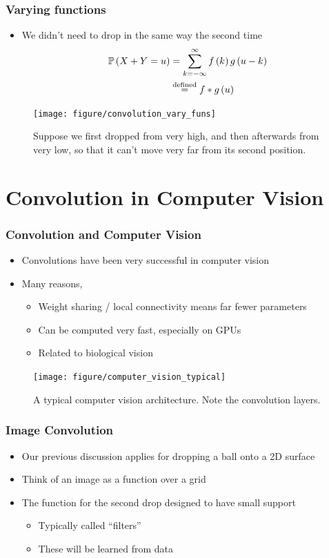 \documentclass[10pt,mathserif]{beamer}
\begin{document}
\begin{frame}
  \frametitle{Varying functions}
  \begin{itemize}
    \item We didn't need to drop in the same way the second time
      \begin{align*}
        \mathbb{P}\left({X + Y = u}\right) &= \sum_{k = -\infty}^{\infty} f\left(k\right)g\left(u - k\right) \\
        &\stackrel{\text{defined}}{=} f * g\left(u\right)
      \end{align*}
  \end{itemize}
  \begin{figure}[ht]
    \centering
    \texttt{[image: figure/convolution\_vary\_funs]}
    \caption{Suppose we first dropped from very high, and then afterwards from
      very low, so that it can't move very far from its second position.
       \label{fig:convolution_vary_funs} }
  \end{figure}
\end{frame}

\section{Convolution in Computer Vision}

\begin{frame}
  \frametitle{Convolution and Computer Vision}
  \begin{itemize}
  \item Convolutions have been very successful in computer vision
  \item Many reasons,
    \begin{itemize}
    \item Weight sharing / local connectivity means far fewer parameters
    \item Can be computed very fast, especially on GPUs
    \item Related to biological vision
    \end{itemize}
  \end{itemize}
\begin{figure}[ht]
  \centering
  \texttt{[image: figure/computer\_vision\_typical]}
  \caption{A typical computer vision architecture. Note the convolution
    layers. \label{fig:label} }
\end{figure}
\end{frame}

\begin{frame}
  \frametitle{Image Convolution}
  \begin{itemize}
  \item Our previous discussion applies for dropping a ball onto a 2D surface
  \item Think of an image as a function over a grid
  \item The function for the second drop designed to have small support
    \begin{itemize}
    \item Typically called ``filters''
    \item These will be learned from data
    \end{itemize}
  \end{itemize}
\end{frame}
\end{document}
